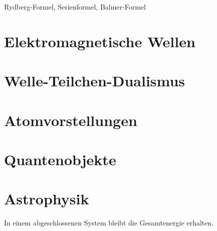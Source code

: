\documentclass[11pt,a4paper,oneside]{article}
\begin{document}
	\begin{loesung}{Rydberg-Formel, Serienformel, Balmer-Formel}

	\end{loesung}
	
	
	\newpage
	
	\section{Elektromagnetische Wellen}

	\section{Welle-Teilchen-Dualismus}
	\section{Atomvorstellungen}
	
	
	\section{Quantenobjekte}
	\section{Astrophysik}
	
	
	\newpage
	
	
	
	
	
	
	\newpage
	
	
	
	
	
	
	
	\begin{theo}
		In einem abgeschlossenen System bleibt die Gesamtenergie erhalten.
	\end{theo}
	
\end{document}
